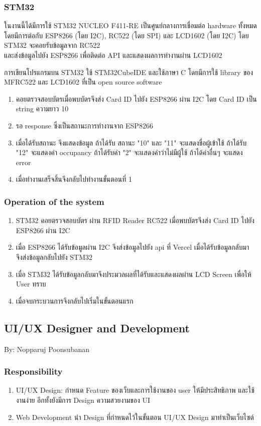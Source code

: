\documentclass[fontsize=14pt]{extarticle}
\begin{document}
\subsubsection{STM32}
\par ในงานนี้ได้มีการใช้ STM32 NUCLEO F411-RE เป็นศูนย์กลางการเชื่อมต่อ hardware ทั้งหมด โดยมีการต่อกับ ESP8266 (โดย I2C), RC522 (โดย SPI) และ LCD1602 (โดย I2C) 
โดย STM32 จะคอยรับข้อมูลจาก RC522 \\และส่งข้อมูลไปยัง ESP8266 เพื่อติดต่อ API และแสดงผลการทำงานผ่าน LCD1602\\
\par การเขียนโปรแกรมบน STM32 ใช้ STM32CubeIDE และใช้ภาษา C โดยมีการใช้ library ของ MFRC522 และ LCD1602 ที่เป็น open source software
\begin{enumerate}
    \item คอยตรวจสอบบัตรเมื่อพบบัตรจึงส่ง Card ID ไปยัง ESP8266 ผ่าน I2C โดย Card ID เป็น string ความยาว 10
    \item รอ response ซึ่งเป็นสถานะการทำงานจาก ESP8266
    \item เมื่อได้รับสถานะ จึงแสดงข้อมูล ถ้าได้รับ สถานะ "10" และ "11" จะแสดงชื่อผู้เข้าใช้ ถ้าได้รับ "12" จะแสดงค่า occupancy ถ้าได้รับค่า "2" จะแสดงค่าว่าไม่มีผู้ใช้ ถ้าได้ค่าอื่นๆ จะแสดง error
    \item เมื่อทำงานเสร็จสิ้นจึงกลับไปทำงานขั้นตอนที่ 1
\end{enumerate}
\subsubsection{Operation of the system}
\begin{enumerate}
    \item STM32 คอยตรวจสอบบัตร  ผ่าน RFID Reader RC522 เมื่อพบบัตรจึงส่ง Card ID ไปยัง ESP8266 ผ่าน I2C
    \item เมื่อ ESP8266 ได้รับข้อมูลผ่าน I2C จึงส่งข้อมูลไปยัง api ที่ Vercel เมื่อได้รับข้อมูลกลับมา จึงส่งข้อมูลกลับไปยัง STM32
    \item เมื่อ STM32 ได้รับข้อมูลกลับมาจึงประมวลผลที่ได้รับและแสดงผลผ่าน LCD Screen เพื่อให้ User ทราบ
    \item เมื่อจบกระบวนการจึงกลับไปเริ่มในขั้นตอนแรก
\end{enumerate}
\pagebreak
\subsection{UI/UX Designer and Development}
By: Nopparuj Poonsubanan
\subsubsection{Responsibility}
\begin{enumerate}
    \item UI/UX Design: กำหนด Feature ของเว็บและการใช้งานของ user ให้มีประสิทธิภาพ และใช้งานง่าย อีกทั้งยังมีการ Design ความสวยงามของ UI
    \item Web Development นำ Design ที่กำหนดไว้ในขั้นตอน UI/UX Design มาทำเป็นเว็บไซต์
\end{enumerate}
\end{document}
